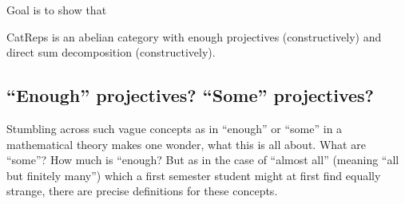 Goal is to show that

CatReps is an abelian category with enough projectives (constructively) and direct sum decomposition (constructively).

\subsection{``Enough'' projectives? ``Some'' projectives?}
Stumbling across such vague concepts as in ``enough'' or ``some'' in a mathematical theory makes one wonder, what this is all about.
What are ``some''? How much is ``enough?
But as in the case of ``almost all'' (meaning ``all but finitely many'') which a first semester student might at first find equally strange, there
are precise definitions for these concepts.

\begin{definition}

\end{definition}
